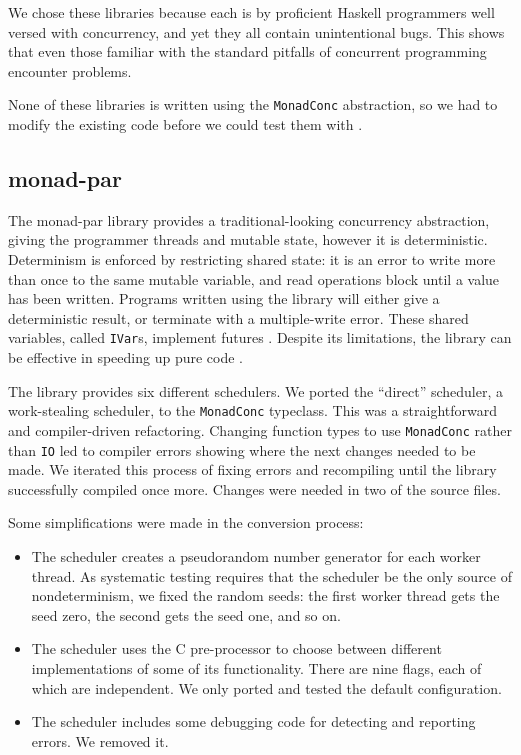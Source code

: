 We chose these libraries because each is by proficient Haskell
programmers well versed with concurrency, and yet they all contain
unintentional bugs.  This shows that even those familiar with the
standard pitfalls of concurrent programming encounter problems.

None of these libraries is written using the \verb|MonadConc|
abstraction, so we had to modify the existing code before we could
test them with \dejafu{}.
\subsection{monad-par}
\label{sec:dejafu-casestudies-par}

The monad-par library \parencite{monad_par,marlow2011} provides a
traditional-looking concurrency abstraction, giving the programmer
threads and mutable state, however it is deterministic.  Determinism
is enforced by restricting shared state: it is an error to write more
than once to the same mutable variable, and read operations block
until a value has been written.  Programs written using the library
will either give a deterministic result, or terminate with a
multiple-write error.  These shared variables, called \verb|IVar|s,
implement futures \parencite{marlow2011}.  Despite its limitations, the
library can be effective in speeding up pure code \parencite{marlow2011}.

The library provides six different schedulers.  We ported the
``direct'' scheduler, a work-stealing scheduler, to the
\verb|MonadConc| typeclass.  This was a straightforward and
compiler-driven refactoring.  Changing function types to use
\verb|MonadConc| rather than \verb|IO| led to compiler errors showing
where the next changes needed to be made.  We iterated this process of
fixing errors and recompiling until the library successfully compiled
once more.  Changes were needed in two of the source files.

Some simplifications were made in the conversion process:

\begin{itemize}
\item The scheduler creates a pseudorandom number generator for each
  worker thread.  As systematic testing requires that the scheduler be
  the only source of nondeterminism, we fixed the random seeds: the
  first worker thread gets the seed zero, the second gets the seed
  one, and so on.
\item The scheduler uses the C pre-processor to choose between
  different implementations of some of its functionality.  There are
  nine flags, each of which are independent.  We only ported and
  tested the default configuration.
\item The scheduler includes some debugging code for detecting and
  reporting errors.  We removed it.
\end{itemize}

